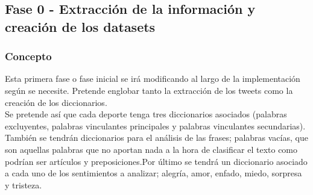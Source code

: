 \documentclass[../all.tex]{subfiles}
\begin{document}
\newpage
\subsection{Fase 0 - Extracción de la información y creación de los datasets}
    \subsubsection{Concepto}
        Esta primera fase o fase inicial se irá modificando al largo de la implementación según se necesite. Pretende englobar tanto la extracción de los tweets como la creación de los diccionarios.\\
        
        Se pretende así que cada deporte tenga tres diccionarios asociados (palabras excluyentes, palabras vinculantes principales y palabras vinculantes secundarias). También se tendrán diccionarios para el análisis de las frases; palabras vacías, que son aquellas palabras que no aportan nada a la hora de clasificar el texto como podrían ser artículos y preposiciones.Por último se tendrá un diccionario asociado a cada uno de los sentimientos a analizar; alegría, amor, enfado, miedo, sorpresa y tristeza.
   \newpage 
\end{document}
